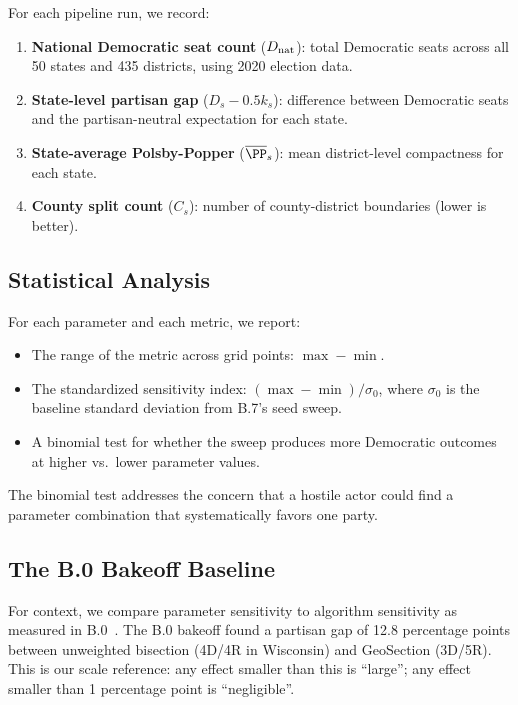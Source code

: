 For each pipeline run, we record:

\begin{enumerate}
\item \textbf{National Democratic seat count} ($D_{\rm nat}$):
      total Democratic seats across all 50 states and 435 districts,
      using 2020 election data.
\item \textbf{State-level partisan gap} ($D_s - 0.5k_s$):
      difference between Democratic seats and the partisan-neutral
      expectation for each state.
\item \textbf{State-average Polsby-Popper} ($\overline{\PP}_s$):
      mean district-level compactness for each state.
\item \textbf{County split count} ($C_s$):
      number of county-district boundaries (lower is better).
\end{enumerate}

\subsection{Statistical Analysis}

For each parameter and each metric, we report:
\begin{itemize}
\item The range of the metric across grid points: $\max - \min$.
\item The standardized sensitivity index: $(\max - \min) / \sigma_0$,
      where $\sigma_0$ is the baseline standard deviation from B.7's
      seed sweep.
\item A binomial test for whether the sweep produces more Democratic
      outcomes at higher vs.\ lower parameter values.
\end{itemize}

The binomial test addresses the concern that a hostile actor could
find a parameter combination that systematically favors one party.

\subsection{The B.0 Bakeoff Baseline}

For context, we compare parameter sensitivity to algorithm sensitivity
as measured in B.0~\citep{b0paper}.
The B.0 bakeoff found a partisan gap of 12.8 percentage points between
unweighted bisection (4D/4R in Wisconsin) and GeoSection (3D/5R).
This is our scale reference: any effect smaller than this is ``large'';
any effect smaller than 1 percentage point is ``negligible''.
